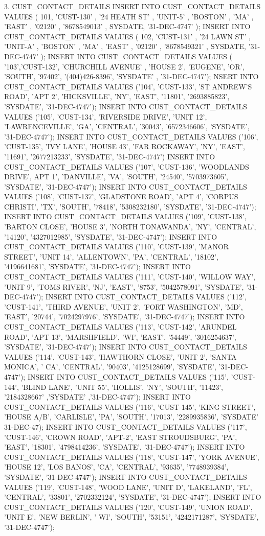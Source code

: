 3.	CUST_CONTACT_DETAILS
INSERT INTO CUST_CONTACT_DETAILS VALUES ( 101, 'CUST-130' , '24 HEATH ST' , 'UNIT-5' , 'BOSTON' , 'MA' , 'EAST' , '02120' , '8678549013' , SYSDATE, '31-DEC-4747' );
INSERT INTO CUST_CONTACT_DETAILS VALUES ( 102, 'CUST-131' , '24 LAWN ST' , 'UNIT-A' , 'BOSTON' , 'MA' , 'EAST' , '02120' , '8678549321' , SYSDATE, '31-DEC-4747' );
INSERT INTO CUST_CONTACT_DETAILS VALUES ( '103','CUST-132', 'CHURCHILL AVENUE' , 'HOUSE 2', 'EUGENE', 'OR', 'SOUTH', '97402', '(404)426-8396', 'SYSDATE' , '31-DEC-4747');
NSERT INTO CUST_CONTACT_DETAILS VALUES ('104', 'CUST-133', 'ST ANDREW'S ROAD', 'APT 2', 'HICKSVILLE', 'NY', 'EAST', '11801', '2693885823', 'SYSDATE', '31-DEC-4747');
INSERT INTO CUST_CONTACT_DETAILS VALUES ('105', 'CUST-134', 'RIVERSIDE DRIVE', 'UNIT 12', 'LAWRENCEVILLE', 'GA', 'CENTRAL', '30043', '6572346606', 'SYSDATE', '31-DEC-4747');
INSERT INTO CUST_CONTACT_DETAILS VALUES ('106', 'CUST-135', 'IVY LANE', 'HOUSE 43', 'FAR ROCKAWAY', 'NY', 'EAST', '11691', '2677213233', 'SYSDATE', '31-DEC-4747')
INSERT INTO CUST_CONTACT_DETAILS VALUES ('107', 'CUST-136', 'WOODLANDS DRIVE', APT 1', 'DANVILLE', 'VA', 'SOUTH', '24540', '5703973605', 'SYSDATE', '31-DEC-4747');
INSERT INTO CUST_CONTACT_DETAILS VALUES ('108', 'CUST-137', 'GLADSTONE ROAD', 'APT 4', 'CORPUS CHRISTI', 'TX', 'SOUTH', '78418', '5308232180', 'SYSDATE', '31-DEC-4747');
INSERT INTO CUST_CONTACT_DETAILS VALUES ('109', 'CUST-138', 'BARTON CLOSE', 'HOUSE 3', 'NORTH TONAWANDA', 'NY', 'CENTRAL', '14120', '4327012985', 'SYSDATE', '31-DEC-4747');
INSERT INTO CUST_CONTACT_DETAILS VALUES ('110', 'CUST-139', 'MANOR STREET', 'UNIT 14', 'ALLENTOWN', 'PA', 'CENTRAL', '18102', '4196641681', 'SYSDATE', '31-DEC-4747');
INSERT INTO CUST_CONTACT_DETAILS VALUES ('111', 'CUST-140', 'WILLOW WAY', 'UNIT 9', 'TOMS RIVER', 'NJ', 'EAST', '8753', '5042578091', 'SYSDATE', '31-DEC-4747');
INSERT INTO CUST_CONTACT_DETAILS VALUES ('112', 'CUST-141', 'THIRD AVENUE', 'UNIT 2', 'FORT WASHINGTON', 'MD', 'EAST', '20744', '7024297976', 'SYSDATE', '31-DEC-4747');
INSERT INTO CUST_CONTACT_DETAILS VALUES ('113', 'CUST-142', 'ARUNDEL ROAD', 'APT 13', 'MARSHFIELD', 'WI', 'EAST', '54449', '3016254637', 'SYSDATE', '31-DEC-4747');
INSERT INTO CUST_CONTACT_DETAILS VALUES ('114', 'CUST-143', 'HAWTHORN CLOSE', 'UNIT 2', 'SANTA MONICA', ' CA', 'CENTRAL', '90403', '4125128699', 'SYSDATE', '31-DEC-4747');
INSERT INTO CUST_CONTACT_DETAILS VALUES ('115', 'CUST-144', 'BLIND LANE', 'UNIT 55', 'HOLLIS', 'NY', 'SOUTH', '11423', '2184328667' ,'SYSDATE' ,'31-DEC-4747');
INSERT INTO CUST_CONTACT_DETAILS VALUES ('116', 'CUST-145', 'KING STREET', 'HOUSE A/B', 'CARLISLE', 'PA', 'SOUTH', '17013', '2289935836', 'SYSDATE' 31-DEC-47);
INSERT INTO CUST_CONTACT_DETAILS VALUES ('117', 'CUST-146', 'CROWN ROAD', 'APT-2', 'EAST STROUDSBURG', 'PA', 'EAST', '18301', '4798414236', 'SYSDATE', '31-DEC-4747');
INSERT INTO CUST_CONTACT_DETAILS VALUES ('118', 'CUST-147', 'YORK AVENUE', 'HOUSE 12', 'LOS BANOS', 'CA', 'CENTRAL', '93635', '7748939384', 'SYSDATE', '31-DEC-4747');
INSERT INTO CUST_CONTACT_DETAILS VALUES ('119', 'CUST-148', 'WOOD LANE', 'UNIT D', 'LAKELAND', 'FL', 'CENTRAL', '33801', '2702332124', 'SYSDATE', '31-DEC-4747');
INSERT INTO CUST_CONTACT_DETAILS VALUES ('120', 'CUST-149', 'UNION ROAD', 'UNIT E', 'NEW BERLIN', ' WI', 'SOUTH', '53151', '4242171287', 'SYSDATE', '31-DEC-4747');


